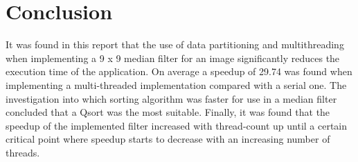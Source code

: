 \section{Conclusion}
It was found in this report that the use of data partitioning and multithreading when implementing a 9 x 9 median filter for an image significantly reduces the execution time of the application. On average a speedup of 29.74 was found when implementing a multi-threaded implementation compared with a serial one. The investigation into which sorting algorithm was faster for use in a median filter concluded that a Qsort was the most suitable. Finally, it was found that the speedup of the implemented filter increased with thread-count up until a certain critical point where speedup starts to decrease with an increasing number of threads.